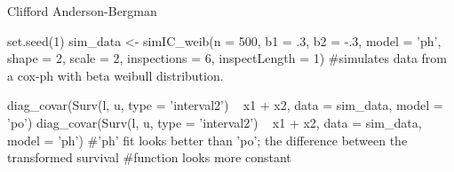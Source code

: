 \documentclass[a4paper]{book}
\begin{document}
%
\begin{Author}\relax
Clifford Anderson-Bergman
\end{Author}
%
\begin{Examples}
\begin{ExampleCode}
	set.seed(1)
	sim_data <- simIC_weib(n = 500, b1 = .3, b2 = -.3, model = 'ph', 
	                       shape = 2, scale = 2, inspections = 6, inspectLength = 1)
	#simulates data from a cox-ph with beta weibull distribution.
	
	diag_covar(Surv(l, u, type = 'interval2') ~ x1 + x2, data = sim_data, model = 'po')
	diag_covar(Surv(l, u, type = 'interval2') ~ x1 + x2, data = sim_data, model = 'ph')
	#'ph' fit looks better than 'po'; the difference between the transformed survival
	#function looks more constant
\end{ExampleCode}
\end{Examples}
\printindex{}
\end{document}

